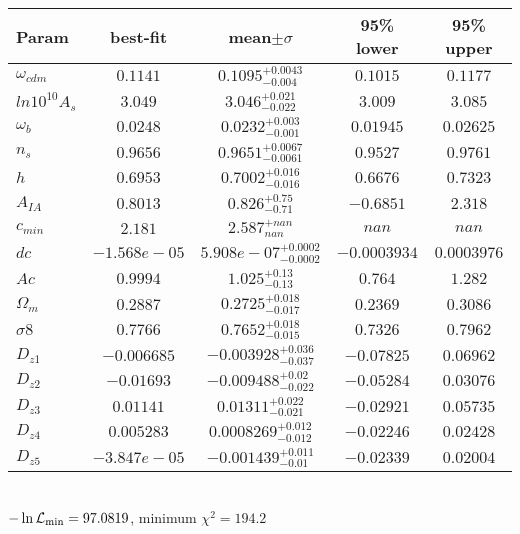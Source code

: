\begin{tabular}{|l|c|c|c|c|} 
 \hline 
Param & best-fit & mean$\pm\sigma$ & 95\% lower & 95\% upper \\ \hline 
$\omega_{cdm }$ &$0.1141$ & $0.1095_{-0.004}^{+0.0043}$ & $0.1015$ & $0.1177$ \\ 
$ln10^{10}A_{s }$ &$3.049$ & $3.046_{-0.022}^{+0.021}$ & $3.009$ & $3.085$ \\ 
$\omega_{b }$ &$0.0248$ & $0.0232_{-0.001}^{+0.003}$ & $0.01945$ & $0.02625$ \\ 
$n_{s }$ &$0.9656$ & $0.9651_{-0.0061}^{+0.0067}$ & $0.9527$ & $0.9761$ \\ 
$h$ &$0.6953$ & $0.7002_{-0.016}^{+0.016}$ & $0.6676$ & $0.7323$ \\ 
$A_{IA }$ &$0.8013$ & $0.826_{-0.71}^{+0.75}$ & $-0.6851$ & $2.318$ \\ 
$c_{min }$ &$2.181$ & $2.587_{nan}^{+nan}$ & $nan$ & $nan$ \\ 
$dc$ &$-1.568e-05$ & $5.908e-07_{-0.0002}^{+0.0002}$ & $-0.0003934$ & $0.0003976$ \\ 
$Ac$ &$0.9994$ & $1.025_{-0.13}^{+0.13}$ & $0.764$ & $1.282$ \\ 
$\Omega_{m }$ &$0.2887$ & $0.2725_{-0.017}^{+0.018}$ & $0.2369$ & $0.3086$ \\ 
$\sigma8$ &$0.7766$ & $0.7652_{-0.015}^{+0.018}$ & $0.7326$ & $0.7962$ \\ 
$D_{z1 }$ &$-0.006685$ & $-0.003928_{-0.037}^{+0.036}$ & $-0.07825$ & $0.06962$ \\ 
$D_{z2 }$ &$-0.01693$ & $-0.009488_{-0.022}^{+0.02}$ & $-0.05284$ & $0.03076$ \\ 
$D_{z3 }$ &$0.01141$ & $0.01311_{-0.021}^{+0.022}$ & $-0.02921$ & $0.05735$ \\ 
$D_{z4 }$ &$0.005283$ & $0.0008269_{-0.012}^{+0.012}$ & $-0.02246$ & $0.02428$ \\ 
$D_{z5 }$ &$-3.847e-05$ & $-0.001439_{-0.01}^{+0.011}$ & $-0.02339$ & $0.02004$ \\ 
\hline 
 \end{tabular} \\ 
$-\ln{\cal L}_\mathrm{min} =97.0819$, minimum $\chi^2=194.2$ \\ 
